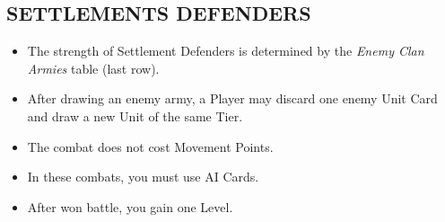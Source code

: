 \begin{multicols}{2}
\subsection*{\MakeUppercase{Settlements defenders}}
\begin{itemize}
  \item The strength of Settlement Defenders is determined by the \textit{Enemy Clan Armies} table (last row).
  \item After drawing an enemy army, a Player may discard one enemy Unit Card and draw a new Unit of the same Tier.
  \item The combat does not cost Movement Points.
  \item In these combats, you must use AI Cards.
  \item After won battle, you gain one Level.
\end{itemize}

\columnbreak

\vspace*{\fill}

\end{multicols}

\vspace{2em}

